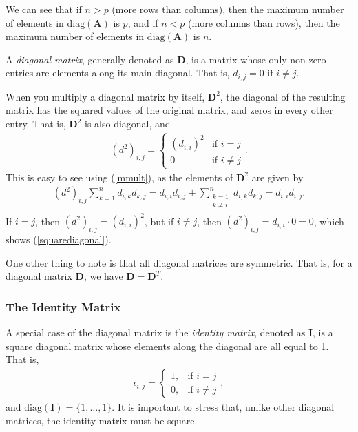 \documentclass[10pt]{article}
\newcommand{\mydef}[1]{\textcolor{SteelBlue3}{\textit{#1}}} %
\begin{document}
We can see that if $n>p$ (more rows than columns), then the maximum number of elements in $\mathrm{diag}(\mathbf{A})$ is $p$, and if $n<p$ (more columns than rows), then the maximum number of elements in $\mathrm{diag}(\mathbf{A})$ is $n$.

A \mydef{diagonal matrix}, generally denoted as $\mathbf{D}$, is a matrix whose only non-zero entries are elements along its main diagonal. That is, $d_{i,j} = 0 \text{ if } i \not = j$. 

When you multiply a diagonal matrix by itself, $\mathbf{D}^2$, the diagonal of the resulting matrix has the squared values of the original matrix, and zeros in every other entry. That is, $\mathbf{D}^2$ is also diagonal, and 
\begin{align}
    \label{squarediagonal}
    (d^2)_{i,j} = \begin{cases}
        (d_{i,i})^2 & \text{if } i = j \\
        0 & \text{if } i \not = j
    \end{cases}.
\end{align}
This is easy to see using (\ref{mmult}), as the elements of $\mathbf{D}^2$ are given by 
\begin{align*}
    (d^2)_{i,j} \sum_{k=1}^n d_{i,k} d_{k,j} = d_{i,i} d_{i,j} +  \sum_{\substack{k=1\\k\not=i}}^n d_{i,k} d_{k,j} = d_{i,i} d_{i,j}.
\end{align*}
If $i=j$, then $(d^2)_{i,j} = (d_{i,i})^2$, but if $i \not = j$, then $(d^2)_{i,j} = d_{i,i} \cdot 0 = 0$, which shows (\ref{squarediagonal}).

One other thing to note is that all diagonal matrices are symmetric. That is, for a diagonal matrix $\mathbf{D}$, we have $\mathbf{D} = \mathbf{D}^T$.

\subsubsection{The Identity Matrix}

A special case of the diagonal matrix is the \mydef{identity matrix}, denoted as $\mathbf{I}$, is a square diagonal matrix whose elements along the diagonal are all equal to 1. That is,
\begin{align}
    \label{identity}
    \iota_{i,j} = \begin{cases}
        1, & \text{if } i = j \\
        0, & \text{if } i \not = j
    \end{cases},
\end{align}
and $\mathrm{diag}(\mathbf{I}) = \{ 1,\ldots,1 \}$. It is important to stress that, unlike other diagonal matrices, the identity matrix must be square. 
\end{document}
